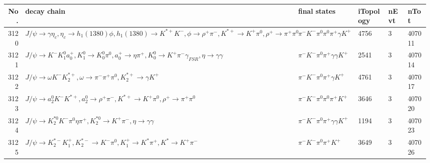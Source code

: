 \begin{table}[htbp] 
\begin{center}
\begin{small}
\begin{tabular}{rlllll}\hline\hline
 No. & decay chain & final states &  iTopology & nEvt & nTot \\\hline
3120&$J/\psi       \rightarrow \gamma       \eta_{c}    , \eta_{c}     \rightarrow h_{1}(1380)    \phi           , h_{1}(1380)     \rightarrow K^{*+}         K^{-}          , \phi            \rightarrow \rho^{+}      \pi^{-}        , K^{*+}          \rightarrow K^{+}          \pi^{0}        , \rho^{+}       \rightarrow \pi^{+}        \pi^{0}        $&$\pi^{-}        K^{-}          \pi^{0}        \pi^{0}        \pi^{+}        \gamma       K^{+}          $& 4756&    3&407011\\
3121&$J/\psi       \rightarrow K^{-}          K_1^{0}        a_{0}^{+}      , K_1^{0}         \rightarrow K_0^{0}        \pi^{0}        , a_{0}^{+}       \rightarrow \eta          \pi^{+}        , K_0^{0}         \rightarrow K^{+}          \pi^{-}        \gamma_{FSR} , \eta           \rightarrow \gamma       \gamma       $&$\pi^{-}        K^{-}          \pi^{0}        \pi^{+}        \gamma       \gamma       K^{+}          $& 2541&    3&407014\\
3122&$J/\psi       \rightarrow \omega         K^{-}          K_2^{*+}       , \omega          \rightarrow \pi^{-}        \pi^{+}        \pi^{0}        , K_2^{*+}        \rightarrow \gamma       K^{+}          $&$\pi^{-}        K^{-}          \pi^{0}        \pi^{+}        \gamma       K^{+}          $& 4761&    3&407017\\
3123&$J/\psi       \rightarrow a_{2}^{0}      K^{-}          K^{*+}         , a_{2}^{0}       \rightarrow \rho^{+}      \pi^{-}        , K^{*+}          \rightarrow K^{+}          \pi^{0}        , \rho^{+}       \rightarrow \pi^{+}        \pi^{0}        $&$\pi^{-}        K^{-}          \pi^{0}        \pi^{0}        \pi^{+}        K^{+}          $& 3646&    3&407020\\
3124&$J/\psi       \rightarrow K_2^{*0}       K^{-}          \pi^{0}        \eta          \pi^{+}        , K_2^{*0}        \rightarrow K^{+}          \pi^{-}        , \eta           \rightarrow \gamma       \gamma       $&$\pi^{-}        K^{-}          \pi^{0}        \pi^{+}        \gamma       \gamma       K^{+}          $& 1194&    3&407023\\
3125&$J/\psi       \rightarrow K_2^{*-}       K_1^{+}        , K_2^{*-}        \rightarrow K^{-}          \pi^{0}        , K_1^{+}         \rightarrow K^{*}          \pi^{+}        , K^{*}           \rightarrow K^{+}          \pi^{-}        $&$\pi^{-}        K^{-}          \pi^{0}        \pi^{+}        K^{+}          $& 3649&    3&407026\\

\end{tabular}
\end{small}
\end{center}
\end{table}
